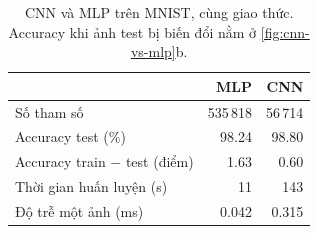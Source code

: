 \begin{table}[tbp]\centering\small
\begin{tabular}{lrr}
\toprule
 & MLP & CNN \\
\midrule
Số tham số & 535\,818 & 56\,714 \\
Accuracy test (\%) & 98.24 & 98.80 \\
Accuracy train $-$ test (điểm) & 1.63 & 0.60 \\
Thời gian huấn luyện (s) & 11 & 143 \\
Độ trễ một ảnh (ms) & 0.042 & 0.315 \\
\bottomrule
\end{tabular}
\caption{CNN và MLP trên MNIST, cùng giao thức. Accuracy khi ảnh test bị biến đổi nằm ở \cref{fig:cnn-vs-mlp}b.}
\label{tab:cnn-vs-mlp}
\end{table}
